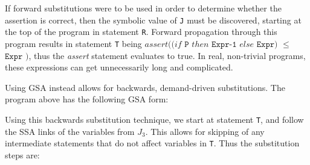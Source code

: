 If forward substitutions were to be used in order to determine whether the assertion is correct, then the symbolic value of \texttt{J} must be discovered, starting at the top of the program in statement \texttt{R}. 
Forward propagation through this program results in statement \texttt{T} being $assert((if $ $\texttt{P}$ $then$ $\texttt{Expr-1}$ $else$ $\texttt{Expr)}$ $\leq$ $\texttt{Expr}$ $\texttt{)}$, thus the \textit{assert} statement evaluates to true. 
In real, non-trivial programs, these expressions can get unnecessarily long and complicated.

Using GSA instead allows for backwards, demand-driven substitutions. The program above has the following GSA form:


Using this backwards substitution technique, we start at statement \texttt{T}, and follow the SSA links of the variables from ${J_3}$. 
This allows for skipping of any intermediate statements that do not affect variables in \texttt{T}. 
Thus the substitution steps are:


